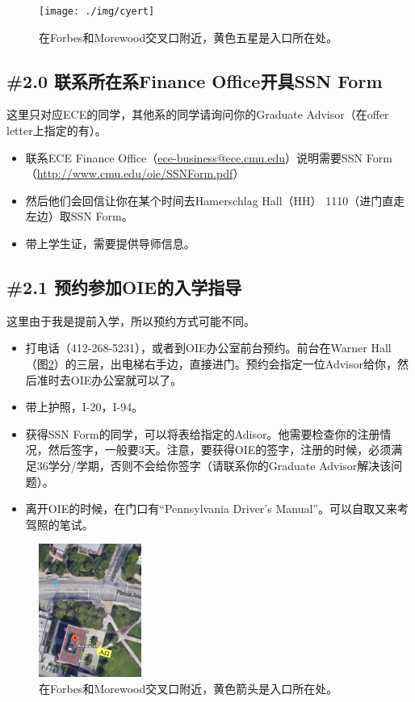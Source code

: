 \documentclass[letterpaper,10pt]{article}
\begin{document}
	\begin{figure}[!h]
		\centering
		\texttt{[image: ./img/cyert]}
		\caption{在Forbes和Morewood交叉口附近，黄色五星是入口所在处。}
		\label{fig:cyert}
	\end{figure}
	
	\subsection*{\#2.0 联系所在系Finance Office开具SSN Form}
	
	这里只对应ECE的同学，其他系的同学请询问你的Graduate Advisor（在offer letter上指定的有）。
	
	\begin{itemize}
		\item 联系ECE Finance Office（\url{ece-business@ece.cmu.edu}）说明需要SSN Form（\url{http://www.cmu.edu/oie/SSNForm.pdf}）
		\item 然后他们会回信让你在某个时间去Hamerschlag Hall（HH） 1110（进门直走左边）取SSN Form。
		\item 带上学生证，需要提供导师信息。
	\end{itemize}
	
	\subsection*{\#2.1 预约参加OIE的入学指导}
	
	这里由于我是提前入学，所以预约方式可能不同。
	
	\begin{itemize}
		\item 打电话（412-268-5231），或者到OIE办公室前台预约。前台在Warner Hall（图\ref{fig:warner}）的三层，出电梯右手边，直接进门。预约会指定一位Advisor给你，然后准时去OIE办公室就可以了。
		\item 带上护照，I-20，I-94。
		\item 获得SSN Form的同学，可以将表给指定的Adisor。他需要检查你的注册情况，然后签字，一般要3天。注意，要获得OIE的签字，注册的时候，必须满足36学分/学期，否则不会给你签字（请联系你的Graduate Advisor解决该问题）。
		\item 离开OIE的时候，在门口有“Pennsylvania Driver's Manual”。可以自取又来考驾照的笔试。
	\end{itemize}
	
	\begin{figure}[!h]
		\centering
		\includegraphics[width=0.3\textwidth]{./img/warner}
		\caption{在Forbes和Morewood交叉口附近，黄色箭头是入口所在处。}
		\label{fig:warner}
	\end{figure}
	
\end{document}
